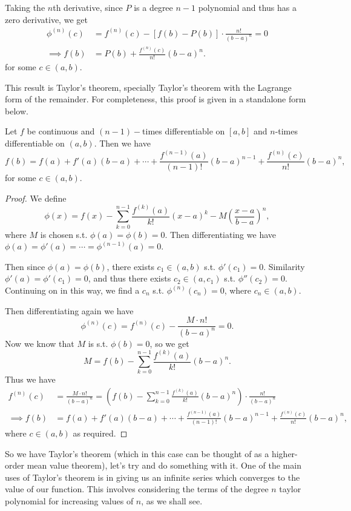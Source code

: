 Taking the $n$th derivative, since $P$ is a degree $n - 1$ polynomial and thus has a zero derivative, we get
\begin{align*}
	\phi^{(n)}(c) &= f^{(n)}(c) - [f(b) - P(b)] \cdot \frac{n!}{(b - a)^n} = 0 \\
\implies f(b)  &= P(b) + \frac{f^{(n)}(c)}{n!}(b - a)^n.
\end{align*}
for some $c \in (a, b)$. 

This result is Taylor's theorem, specially Taylor's theorem with the Lagrange form of the remainder. For completeness, this proof is given in a standalone form below.

\begin{theorem}
	Let $f$ be continuous and $(n - 1)-$times differentiable on $[a, b]$ and $n$-times differentiable on $(a, b)$. Then we have
	$$
	f(b) = f(a) + f'(a)(b - a) + \cdots + \frac{f^{(n - 1)}(a)}{(n - 1)!}(b - a)^{n - 1} + \frac{f^{(n)}(c)}{n!}(b - a)^n,
	$$
	for some $c \in (a, b)$.
\end{theorem}
\begin{proof}
	We define
	$$
	\phi(x) = f(x) - \sum_{k = 0}^{n - 1} \frac{f^{(k)}(a)}{k!}(x - a)^k - M \left(\frac{x - a}{b - a}\right)^n,
	$$
	where $M$ is chosen s.t. $\phi(a) = \phi(b) = 0$.
	Then differentiating we have $\phi(a) = \phi'(a) = \cdots = \phi^{(n - 1)}(a) = 0$. 

	Then since $\phi(a) = \phi(b)$, there exists $c_1 \in (a, b)$ s.t. $\phi'(c_1) = 0$. Similarity $\phi'(a) = \phi'(c_1) = 0$, and thus there exists $c_2 \in (a, c_1)$ s.t. $\phi''(c_2) = 0$. Continuing on in this way, we find a $c_{n}$ s.t. $\phi^{(n)}(c_n) = 0$, where $c_n \in (a, b)$. 

	Then differentiating again we have
	$$
	\phi^{(n)}(c) = f^{(n)}(c) - \frac{M \cdot n!}{(b - a)^n} = 0.
	$$
	Now we know that $M$ is s.t. $\phi(b) = 0$, so we get
	$$
	M = f(b) - \sum_{k = 0}^{n - 1}\frac{f^{(k)}(a)}{k!} (b - a)^n.
	$$
	Thus we have
	\begin{align*}
		f^{(n)}(c) &= \frac{M \cdot n!}{(b - a)^n} = \left(f(b) - \sum_{k = 0}^{n - 1}\frac{f^{(k)}(a)}{k!} (b - a)^n\right) \cdot \frac{n!}{(b - a)^n} \\
\implies f(b) &= f(a) + f'(a)(b - a) + \cdots + \frac{f^{(n - 1)}(a)}{(n - 1)!}(b - a)^{n - 1} + \frac{f^{(n)}(c)}{n!}(b - a)^n,
	\end{align*}
	where $c \in (a, b)$ as required.
\end{proof}


So we have Taylor's theorem (which in this case can be thought of as a higher-order mean value theorem), let's try and do something with it. One of the main uses of Taylor's theorem is in giving us an infinite series which converges to the value of our function. This involves considering the terms of the degree $n$ taylor polynomial for increasing values of $n$, as we shall see.


